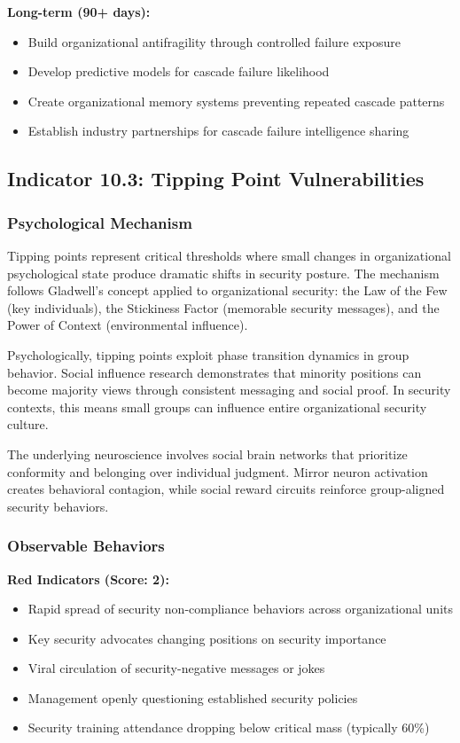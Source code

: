 \documentclass[11pt,a4paper]{article}
\begin{document}
\textbf{Long-term (90+ days):}
\begin{itemize}
\item Build organizational antifragility through controlled failure exposure
\item Develop predictive models for cascade failure likelihood
\item Create organizational memory systems preventing repeated cascade patterns
\item Establish industry partnerships for cascade failure intelligence sharing
\end{itemize}

\subsection{Indicator 10.3: Tipping Point Vulnerabilities}

\subsubsection{Psychological Mechanism}

Tipping points represent critical thresholds where small changes in organizational psychological state produce dramatic shifts in security posture. The mechanism follows Gladwell's\cite{gladwell2000} concept applied to organizational security: the Law of the Few (key individuals), the Stickiness Factor (memorable security messages), and the Power of Context (environmental influence).

Psychologically, tipping points exploit phase transition dynamics in group behavior. Social influence research demonstrates that minority positions can become majority views through consistent messaging and social proof\cite{moscovici1969}. In security contexts, this means small groups can influence entire organizational security culture.

The underlying neuroscience involves social brain networks that prioritize conformity and belonging over individual judgment. Mirror neuron activation creates behavioral contagion, while social reward circuits reinforce group-aligned security behaviors.

\subsubsection{Observable Behaviors}

\textbf{Red Indicators (Score: 2):}
\begin{itemize}
\item Rapid spread of security non-compliance behaviors across organizational units
\item Key security advocates changing positions on security importance
\item Viral circulation of security-negative messages or jokes
\item Management openly questioning established security policies
\item Security training attendance dropping below critical mass (typically 60\%)
\end{itemize}
\end{document}
